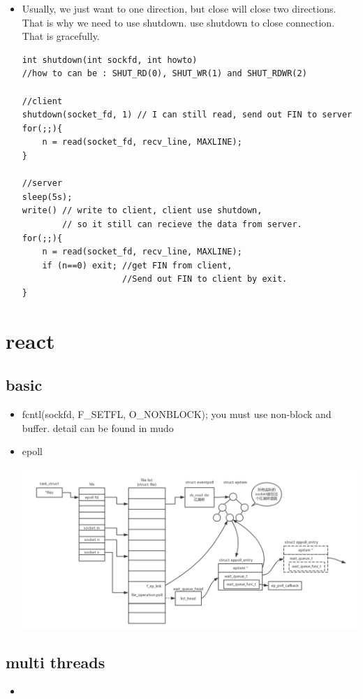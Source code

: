 \documentclass[a4paper,11pt,twoside]{book}
\begin{document}
\begin{itemize}
	\item Usually, we just want to one direction, but close will close two directions. That is why we need to use shutdown. use shutdown to close connection. That is gracefully.
\begin{lstlisting}
int shutdown(int sockfd, int howto)
//how to can be : SHUT_RD(0), SHUT_WR(1) and SHUT_RDWR(2)

//client
shutdown(socket_fd, 1) // I can still read, send out FIN to server
for(;;){
	n = read(socket_fd, recv_line, MAXLINE);
}

//server
sleep(5s);
write() // write to client, client use shutdown, 
        // so it still can recieve the data from server. 
for(;;){
	n = read(socket_fd, recv_line, MAXLINE);
	if (n==0) exit; //get FIN from client, 
	                //Send out FIN to client by exit.
}
\end{lstlisting}
	
\end{itemize}

\section{react}
\subsection{basic}
\begin{itemize}
	\item    fcntl(sockfd, F\_SETFL, O\_NONBLOCK); you must use non-block and buffer. detail can be found in mudo
	\item epoll
\begin{center}
	\includegraphics[width=0.85\linewidth]{pics/epoll.png}
\end{center}
\end{itemize}
\subsection{multi threads}
\begin{itemize}
	\item 
\end{itemize}
\end{document}
